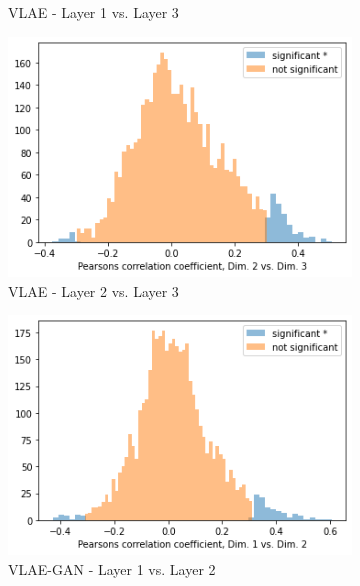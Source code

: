 \begin{figure}
\begin{subfigure}{.3\textwidth}
        \caption{\ac{VLAE} - Layer 1 vs. Layer 3}
    \end{subfigure}
    \hfill
    \begin{subfigure}{.3\textwidth}
        \includegraphics[width=\textwidth]{images/notprop/dsprites/vlae/dim_2_3.png}
        \caption{\ac{VLAE} - Layer 2 vs. Layer 3}
    \end{subfigure}
    \begin{subfigure}{.3\textwidth}
        \includegraphics[width=\textwidth]{images/notprop/dsprites/vlae_gan/dim_1_2.png}
        \caption{\ac{VLAE}-\ac{GAN} - Layer 1 vs. Layer 2}
    \end{subfigure}
    \hfill
    \begin{subfigure}{.3\textwidth}

\end{subfigure}
\end{figure}
